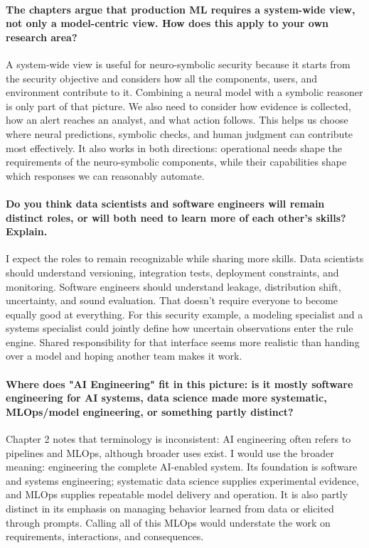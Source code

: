\documentclass[11pt]{article}
\begin{document}
\paragraph{The chapters argue that production ML requires a system-wide view, not only a model-centric view. How does this apply to your own research area?}

A system-wide view is useful for neuro-symbolic security because it starts from the security objective and considers how all the components, users, and environment contribute to it. Combining a neural model with a symbolic reasoner is only part of that picture. We also need to consider how evidence is collected, how an alert reaches an analyst, and what action follows. This helps us choose where neural predictions, symbolic checks, and human judgment can contribute most effectively. It also works in both directions: operational needs shape the requirements of the neuro-symbolic components, while their capabilities shape which responses we can reasonably automate.

\paragraph{Do you think data scientists and software engineers will remain distinct roles, or will both need to learn more of each other's skills? Explain.}
I expect the roles to remain recognizable while sharing more skills. Data scientists should understand versioning, integration tests, deployment constraints, and monitoring. Software engineers should understand leakage, distribution shift, uncertainty, and sound evaluation. That doesn't require everyone to become equally good at everything. For this security example, a modeling specialist and a systems specialist could jointly define how uncertain observations enter the rule engine. Shared responsibility for that interface seems more realistic than handing over a model and hoping another team makes it work.

\paragraph{Where does "AI Engineering" fit in this picture: is it mostly software engineering for AI systems, data science made more systematic, MLOps/model engineering, or something partly distinct?}
Chapter 2 notes that terminology is inconsistent: AI engineering often refers to pipelines and MLOps, although broader uses exist. I would use the broader meaning: engineering the complete AI-enabled system. Its foundation is software and systems engineering; systematic data science supplies experimental evidence, and MLOps supplies repeatable model delivery and operation. It is also partly distinct in its emphasis on managing behavior learned from data or elicited through prompts. Calling all of this MLOps would understate the work on requirements, interactions, and consequences.
\end{document}
